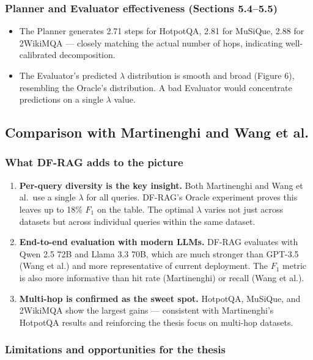 \documentclass[11pt,a4paper]{article}
\begin{document}
\subsubsection{Planner and Evaluator effectiveness (Sections 5.4--5.5)}

\begin{itemize}[leftmargin=*]
	\item The Planner generates 2.71 steps for HotpotQA, 2.81 for MuSiQue, 2.88 for 2WikiMQA --- closely matching the actual number of hops, indicating well-calibrated decomposition.
	\item The Evaluator's predicted $\lambda$ distribution is smooth and broad (Figure 6), resembling the Oracle's distribution. A bad Evaluator would concentrate predictions on a single $\lambda$ value.
\end{itemize}

\subsection{Comparison with Martinenghi and Wang et al.}

\subsubsection{What DF-RAG adds to the picture}

\begin{enumerate}[leftmargin=*]
	\item \textbf{Per-query diversity is the key insight.} Both Martinenghi and Wang et al.\ use a single $\lambda$ for all queries. DF-RAG's Oracle experiment proves this leaves up to 18\% $F_1$ on the table. The optimal $\lambda$ varies not just across datasets but across individual queries within the same dataset.
	\item \textbf{End-to-end evaluation with modern LLMs.} DF-RAG evaluates with Qwen 2.5 72B and Llama 3.3 70B, which are much stronger than GPT-3.5 (Wang et al.) and more representative of current deployment. The $F_1$ metric is also more informative than hit rate (Martinenghi) or recall (Wang et al.).
	\item \textbf{Multi-hop is confirmed as the sweet spot.} HotpotQA, MuSiQue, and 2WikiMQA show the largest gains --- consistent with Martinenghi's HotpotQA results and reinforcing the thesis focus on multi-hop datasets.
\end{enumerate}

\subsubsection{Limitations and opportunities for the thesis}
\end{document}
